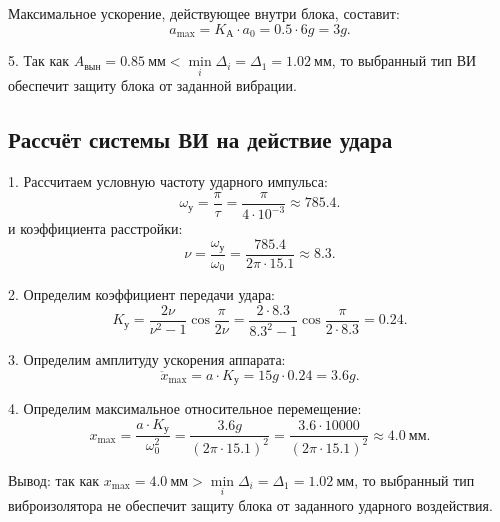 Максимальное ускорение, действующее внутри блока, составит:
\[
    a_{\max} = K_А \cdot a_0
    = 0.5 \cdot 6g
    = 3g.
\]

5. Так как $A_{вын} = 0.85~мм < \min\limits_i \Delta_i = \Delta_1 = 1.02~мм$, то выбранный тип ВИ обеспечит защиту блока от заданной вибрации.

\subsection{Рассчёт системы ВИ на действие удара}
1. Рассчитаем условную частоту ударного импульса:
\[
    \omega_у
    = \frac{\pi}{\tau}
    = \frac{\pi}{4 \cdot 10^{-3}}
    \approx 785.4.
\]
и коэффициента расстройки:
\[
    \nu
    = \frac{\omega_у}{\omega_0}
    = \frac{785.4}{2 \pi \cdot 15.1}
    \approx 8.3.
\]

2. Определим коэффициент передачи удара:
\[
    K_у
    = \frac{2 \nu}{\nu^2 - 1} \cos \frac{\pi}{2 \nu}
    = \frac{2 \cdot 8.3}{8.3^2 - 1} \cos \frac{\pi}{2 \cdot 8.3}
    = 0.24.
\]

3. Определим амплитуду ускорения аппарата:
\[
    \ddot{x}_{\max}
    = a \cdot K_у
    = 15 g \cdot 0.24
    = 3.6 g.
\]

4. Определим максимальное относительное перемещение:
\[
    x_{\max}
    = \frac{a \cdot K_у}{\omega_0^2}
    = \frac{3.6 g}{\left(2 \pi \cdot 15.1\right)^2}
    = \frac{3.6 \cdot 10000}{\left(2 \pi \cdot 15.1\right)^2}
    \approx 4.0~мм.
\]

Вывод: так как $x_{\max} = 4.0~мм > \min\limits_i \Delta_i = \Delta_1 = 1.02~мм$, то выбранный тип виброизолятора не обеспечит защиту блока от заданного ударного воздействия.
